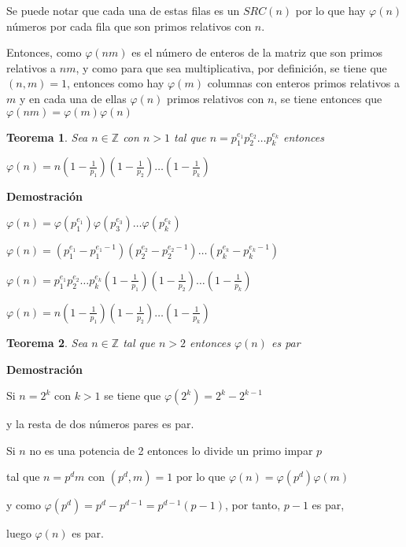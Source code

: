 \documentclass[a4paper,12pt]{report}
\newtheorem*{teo}{Teorema}
\begin{document}
Se puede notar que cada una de estas filas es un $SRC(n)$ por lo que hay $\varphi(n)$ números por cada fila que son primos relativos con $n$.

Entonces, como $\varphi(nm)$ es el número de enteros de la matriz que son primos relativos a $nm$, y como para que sea multiplicativa, por definición, se tiene que $(n,m)=1$, entonces como hay $\varphi(m)$ columnas con enteros primos relativos a $m$ y en cada una de ellas $\varphi(n)$ primos relativos con $n$, se tiene entonces que $\varphi(nm)=\varphi(m)\varphi(n)$

\begin{teo}
 Sea $n\in\mathbb{Z}$ con $n>1$ tal que $n=p_1^{e_1}p_2^{e_2}\dots p_k^{e_k}$ entonces

 $\varphi(n)=n(1-\frac{1}{p_1})(1-\frac{1}{p_2})\dots(1-\frac{1}{p_k})$
\end{teo}

\textbf{Demostración}

$\varphi(n)=\varphi(p_1^{e_1})\varphi(p_3^{e_3})\dots\varphi(p_k^{e_k})$

$\varphi(n)=(p_1^{e_1}-p_1^{e_1-1})(p_2^{e_2}-p_2^{e_2-1})\dots(p_k^{e_k}-p_k^{e_k-1})$

$\varphi(n)=p_1^{e_1}p_2^{e_2}\dots p_k^{e_k}(1-\frac{1}{p_1})(1-\frac{1}{p_2})\dots(1-\frac{1}{p_k})$

$\varphi(n)=n(1-\frac{1}{p_1})(1-\frac{1}{p_2})\dots(1-\frac{1}{p_k})$

\newpage

\begin{teo}
 Sea $n\in\mathbb{Z}$ tal que $n>2$ entonces $\varphi(n)$ es par
\end{teo}


\textbf{Demostración}

Si $n=2^k$ con $k>1$ se tiene que $\varphi(2^k)=2^k-2^{k-1}$

y la resta de dos números pares es par.

Si $n$ no es una potencia de 2 entonces lo divide un primo impar $p$

tal que $n=p^dm$ con $(p^d,m)=1$ por lo que $\varphi(n)=\varphi(p^d)\varphi(m)$

y como $\varphi(p^d)=p^d-p^{d-1}=p^{d-1}(p-1)$, por tanto, $p-1$ es par,

luego  $\varphi(n)$ es par.
\end{document}
